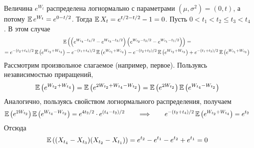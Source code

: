 \begin{solution}
    Величина $ e^{W_t} $ распределена логнормально с параметрами $ (\mu, \sigma^2) = (0, t) $, а потому $ \operatorname{\mathbb{E}} e^{W_t} = e^{0-t/2} $.
    Тогда $ \operatorname{\mathbb{E}} X_t = e^{t/2 - t/2} - 1 = 0 $.
    Пусть $ 0 < t_1 < t_2 \leqslant t_3 < t_4 $.
    В этом случае
    \begin{multline*}
        \operatorname{\mathbb{E}} \left( \left( e^{W_{t_4} - t_4/2} - e^{W_{t_3} - t_3/2} \right) \left( e^{W_{t_2} - t_2/2} - e^{W_{t_1} - t_1/2} \right) \right) = \\
        = e^{-(t_2 + t_4)/2} \operatorname{\mathbb{E}} \left( e^{W_{t_2} + W_{t_4}} \right) - e^{-(t_1 + t_4)/2} \operatorname{\mathbb{E}} \left( e^{W_{t_1} + W_{t_4}} \right)
        - e^{-(t_2 + t_3)/2} \operatorname{\mathbb{E}} \left( e^{W_{t_2} + W_{t_3}} \right) + e^{-(t_1 + t_3)/2} \operatorname{\mathbb{E}} \left( e^{W_{t_1} + W_{t_3}} \right)
    \end{multline*}
    Рассмотрим произвольное слагаемое (например, первое).
    Пользуясь независимостью приращений,
    \[
        \operatorname{\mathbb{E}} \left( e^{W_{t_2} + W_{t_4}} \right) = \operatorname{\mathbb{E}} \left( e^{2 W_{t_2} + W_{t_4} - W_{t_2}} \right) = \operatorname{\mathbb{E}} \left( e^{2 W_{t_2}} \right) \operatorname{\mathbb{E}} \left( e^{W_{t_4} - W_{t_2}} \right)
    \]
    Аналогично, пользуясь свойством логнормального распределения, получаем
    \[
        \operatorname{\mathbb{E}} \left( e^{2 W_{t_2}} \right) \operatorname{\mathbb{E}} \left( e^{W_{t_4} - W_{t_2}} \right) = e^{4 t_2 / 2} \cdot e^{(t_4 - t_2) / 2}
        \qquad \Longrightarrow \qquad
        e^{-(t_2 + t_4)/2} \operatorname{\mathbb{E}} \left( e^{W_{t_2} + W_{t_4}} \right) = e^{t_2}
    \]
    Отсюда
    \[
        \operatorname{\mathbb{E}} \left( (X_{t_4} - X_{t_3})(X_{t_2} - X_{t_1}) \right) = e^{t_2} - e^{t_1} - e^{t_2} + e^{t_1} = 0
    \]
\end{solution}

